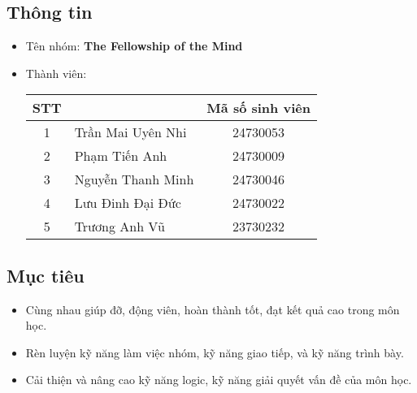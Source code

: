 \documentclass[a4paper, 12pt]{article}
\begin{document}
\subsection{Thông tin}
\renewcommand{\arraystretch}{1.5}
\begin{itemize}
    \item Tên nhóm: \large \textbf{The Fellowship of the Mind}
    \item Thành viên:
    \begin{table}[h]
        \centering
        \begin{tabular}{|c|>{\raggedright\arraybackslash}p{5cm}|c|}
            \hline
            \textbf{STT} & \multicolumn{1}{c|}{\textbf{Tên}} & \textbf{Mã số sinh viên} \\
            \hline
            1 & Trần Mai Uyên Nhi & 24730053 \\
            \hline
            2 & Phạm Tiến Anh & 24730009 \\
            \hline
            3 & Nguyễn Thanh Minh & 24730046 \\
            \hline
            4 & Lưu Đinh Đại Đức & 24730022 \\
            \hline
            5 & Trương Anh Vũ & 23730232 \\
            \hline
        \end{tabular}
\end{table}
\end{itemize}

\subsection{Mục tiêu}
\begin{itemize}
    \item Cùng nhau giúp đỡ, động viên, hoàn thành tốt, đạt kết quả cao trong môn học.
    \item Rèn luyện kỹ năng làm việc nhóm, kỹ năng giao tiếp, và kỹ năng trình bày.
    \item Cải thiện và nâng cao kỹ năng logic, kỹ năng giải quyết vấn đề của môn học.
\end{itemize}
\end{document}
